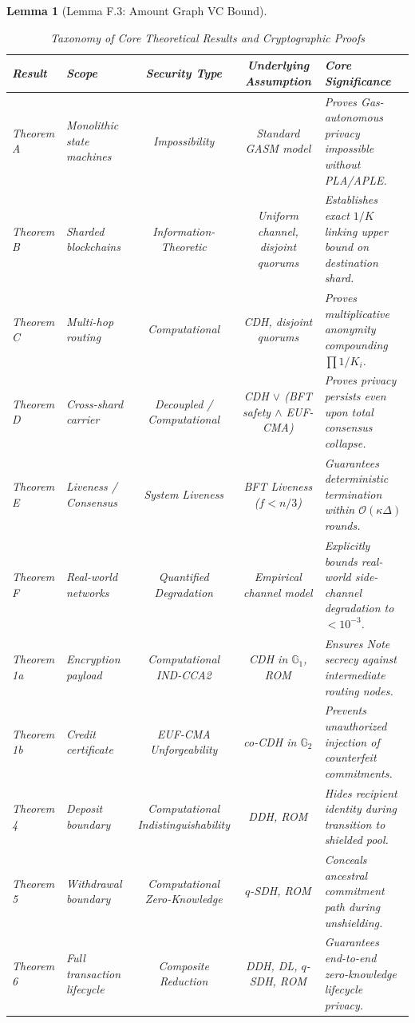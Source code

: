 \documentclass[journal,10pt,twocolumn]{IEEEtran}
\newtheorem{lemma}[theorem]{Lemma}
\theoremstyle{definition}
\theoremstyle{remark}
\begin{document}
\begin{lemma}[Lemma F.3: Amount Graph VC Bound]
\begin{table}[t]
\centering
\caption{Taxonomy of Core Theoretical Results and Cryptographic Proofs}
\label{tab:theorems_summary}
\small
\begin{tabularx}{\textwidth}{llccX}
\toprule
\textbf{Result} & \textbf{Scope} & \textbf{Security Type} & \textbf{Underlying Assumption} & \textbf{Core Significance} \\
\midrule
Theorem A & Monolithic state machines & Impossibility & Standard GASM model & Proves Gas-autonomous privacy impossible without PLA/APLE. \\
Theorem B & Sharded blockchains & Information-Theoretic & Uniform channel, disjoint quorums & Establishes exact $1/K$ linking upper bound on destination shard. \\
Theorem C & Multi-hop routing & Computational & CDH, disjoint quorums & Proves multiplicative anonymity compounding $\prod 1/K_i$. \\
Theorem D & Cross-shard carrier & Decoupled / Computational & CDH $\lor$ (BFT safety $\land$ EUF-CMA) & Proves privacy persists even upon total consensus collapse. \\
Theorem E & Liveness / Consensus & System Liveness & BFT Liveness ($f < n/3$) & Guarantees deterministic termination within $\mathcal{O}(\kappa\Delta)$ rounds. \\
Theorem F & Real-world networks & Quantified Degradation & Empirical channel model & Explicitly bounds real-world side-channel degradation to $< 10^{-3}$. \\
Theorem 1a & Encryption payload & Computational IND-CCA2 & CDH in $\mathbb{G}_1$, ROM & Ensures Note secrecy against intermediate routing nodes. \\
Theorem 1b & Credit certificate & EUF-CMA Unforgeability & co-CDH in $\mathbb{G}_2$ & Prevents unauthorized injection of counterfeit commitments. \\
Theorem 4 & Deposit boundary & Computational Indistinguishability & DDH, ROM & Hides recipient identity during transition to shielded pool. \\
Theorem 5 & Withdrawal boundary & Computational Zero-Knowledge & $q$-SDH, ROM & Conceals ancestral commitment path during unshielding. \\
Theorem 6 & Full transaction lifecycle & Composite Reduction & DDH, DL, $q$-SDH, ROM & Guarantees end-to-end zero-knowledge lifecycle privacy. \\
\bottomrule
\end{tabularx}
\end{table}


\end{lemma}
\end{document}

